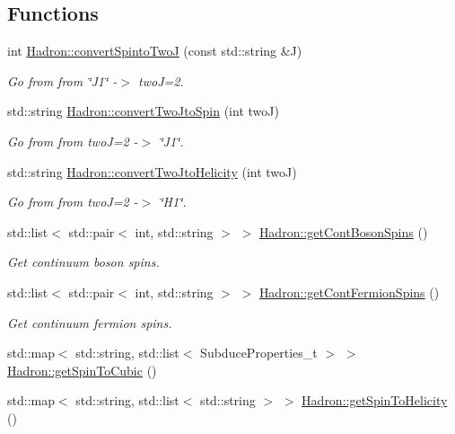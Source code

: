 \subsection*{Functions}
\begin{DoxyCompactItemize}
\item 
int \mbox{\hyperlink{namespaceHadron_acca1db731e7341c6fce2d78c3442c739}{Hadron\+::convert\+Spinto\+TwoJ}} (const std\+::string \&J)
\begin{DoxyCompactList}\small\item\em Go from from \char`\"{}\+J1\char`\"{} -\/$>$ twoJ=2. \end{DoxyCompactList}\item 
std\+::string \mbox{\hyperlink{namespaceHadron_a8593942e8f0063aaf40c4593dbb2cdbe}{Hadron\+::convert\+Two\+Jto\+Spin}} (int twoJ)
\begin{DoxyCompactList}\small\item\em Go from from twoJ=2 -\/$>$ \char`\"{}\+J1\char`\"{}. \end{DoxyCompactList}\item 
std\+::string \mbox{\hyperlink{namespaceHadron_a354d39c9f601a0a0f19857eb4b79a2d2}{Hadron\+::convert\+Two\+Jto\+Helicity}} (int twoJ)
\begin{DoxyCompactList}\small\item\em Go from from twoJ=2 -\/$>$ \char`\"{}\+H1\char`\"{}. \end{DoxyCompactList}\item 
std\+::list$<$ std\+::pair$<$ int, std\+::string $>$ $>$ \mbox{\hyperlink{namespaceHadron_a758e677215948a2af60fc6fee269d410}{Hadron\+::get\+Cont\+Boson\+Spins}} ()
\begin{DoxyCompactList}\small\item\em Get continuum boson spins. \end{DoxyCompactList}\item 
std\+::list$<$ std\+::pair$<$ int, std\+::string $>$ $>$ \mbox{\hyperlink{namespaceHadron_a7131ce7dd50310f2beeabb2a83dde484}{Hadron\+::get\+Cont\+Fermion\+Spins}} ()
\begin{DoxyCompactList}\small\item\em Get continuum fermion spins. \end{DoxyCompactList}\item 
std\+::map$<$ std\+::string, std\+::list$<$ Subduce\+Properties\+\_\+t $>$ $>$ \mbox{\hyperlink{namespaceHadron_a0ad570b7ce2fbc8f215d0a5ee08afdb2}{Hadron\+::get\+Spin\+To\+Cubic}} ()
\item 
std\+::map$<$ std\+::string, std\+::list$<$ std\+::string $>$ $>$ \mbox{\hyperlink{namespaceHadron_a65015bc93f8b83c79f094361b407ed28}{Hadron\+::get\+Spin\+To\+Helicity}} ()

\end{DoxyCompactItemize}
